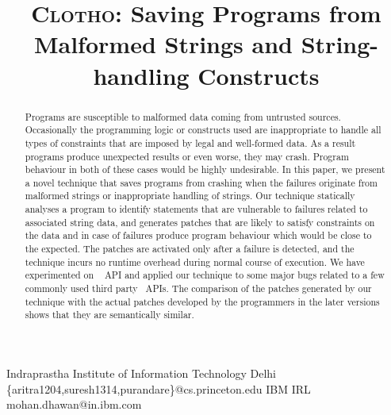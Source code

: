 \documentclass[pldi]{sigplanconf}
\def\tool{\textsc{Clotho}\xspace}
\def\papertitle{\tool: Saving Programs from Malformed Strings and String-handling Constructs}
\begin{document}
\title{\Large \bf \papertitle}

{Indraprastha Institute of Information Technology Delhi}
{\{aritra1204,suresh1314,purandare\}@cs.princeton.edu}
{IBM IRL}
{mohan.dhawan@in.ibm.com}

\maketitle



\begin{abstract}
\small


Programs are susceptible to malformed data coming from untrusted sources. Occasionally the programming logic or constructs
used are inappropriate to handle all types of constraints that are imposed by legal and well-formed data.
As a result programs produce unexpected results or even worse, they may crash. Program behaviour in both 
of these cases would be highly undesirable. In this paper, we present a 
novel technique that saves programs from crashing when the failures originate from malformed strings or inappropriate handling of strings.
Our technique statically analyses a program to identify statements that are vulnerable to failures related to associated string data, and
generates patches that are likely to satisfy constraints on the data and in case of failures produce program behaviour which would be close to the expected.
The patches are activated only after a failure is detected, and the technique incurs no runtime overhead during normal course of execution.
We have experimented on \java\  API and applied our technique to some major bugs related to a few commonly used third party \java\ APIs. The comparison of the
patches generated by our technique with the actual patches developed by the programmers in the later
versions shows that they are semantically similar.



\end{abstract}
\end{document}
